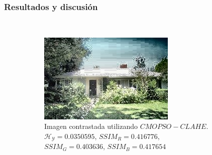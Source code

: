 \documentclass[usenames,dvipsnames]{beamer}
\begin{document}
    \begin{frame}
    \frametitle{Resultados y discusión} 

\begin{figure}[H]
\centering
    ~ %
    \begin{subfigure}[t]{0.45\textwidth}
    \includegraphics[width=\textwidth]{graphics/calhouse_0230_20-62968204656-00.jpg}
    \caption{Imagen contrastada utilizando $CMOPSO-CLAHE$.  $\mathscr{H_Y}=0.0350595$, $SSIM_R=0.416776$, $SSIM_G=0.403636$, $SSIM_B=0.417654$}
    \label{fig:casa1enhanced2}
    \end{subfigure} 
    \begin{subfigure}[t]{0.45\textwidth}

\end{subfigure}
\end{figure}
\end{frame}
\end{document}
